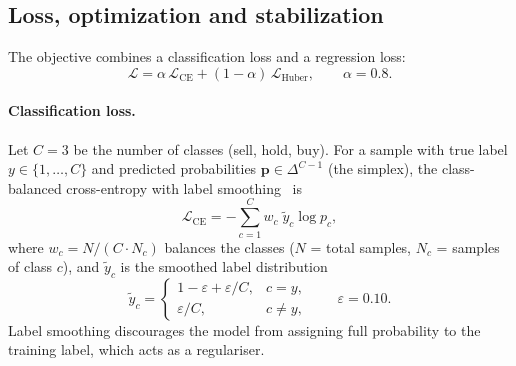\documentclass[runningheads]{llncs}
\begin{document}
\subsection{Loss, optimization and stabilization}
\label{sec:methodology-loss}
The objective combines a classification loss and a regression loss:
\begin{equation}
\mathcal{L} = \alpha\,\mathcal{L}_{\text{CE}} + (1-\alpha)\,\mathcal{L}_{\text{Huber}},
\qquad \alpha = 0.8.
\end{equation}

\paragraph{Classification loss.}
Let $C = 3$ be the number of classes (sell, hold, buy). For a sample with true
label $y \in \{1,\dots,C\}$ and predicted probabilities $\mathbf{p} \in
\Delta^{C-1}$ (the simplex), the class-balanced cross-entropy with label
smoothing~\cite{szegedy2016} is
\begin{equation}
\mathcal{L}_{\text{CE}} = - \sum_{c=1}^{C} w_c \; \tilde{y}_c \log p_c,
\end{equation}
where $w_c = N / (C \cdot N_c)$ balances the classes ($N$ = total samples,
$N_c$ = samples of class $c$), and $\tilde{y}_c$ is the smoothed label
distribution
\begin{equation}
\tilde{y}_c =
\begin{cases}
1 - \varepsilon + \varepsilon / C, & c = y,\\[2pt]
\varepsilon / C, & c \neq y,
\end{cases}
\qquad \varepsilon = 0.10.
\end{equation}
Label smoothing discourages the model from assigning full probability to the
training label, which acts as a regulariser.
\end{document}

